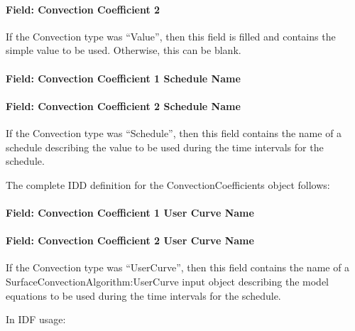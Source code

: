 \paragraph{Field: Convection Coefficient 2}\label{field-convection-coefficient-2}

If the Convection type was ``Value'', then this field is filled and contains the simple value to be used. Otherwise, this can be blank.

\paragraph{Field: Convection Coefficient 1 Schedule Name}\label{field-convection-coefficient-1-schedule-name}

\paragraph{Field: Convection Coefficient 2 Schedule Name}\label{field-convection-coefficient-2-schedule-name}

If the Convection type was ``Schedule'', then this field contains the name of a schedule describing the value to be used during the time intervals for the schedule.

The complete IDD definition for the ConvectionCoefficients object follows:

\paragraph{Field: Convection Coefficient 1 User Curve Name}\label{field-convection-coefficient-1-user-curve-name}

\paragraph{Field: Convection Coefficient 2 User Curve Name}\label{field-convection-coefficient-2-user-curve-name}

If the Convection type was ``UserCurve'', then this field contains the name of a SurfaceConvectionAlgorithm:UserCurve input object describing the model equations to be used during the time intervals for the schedule.

In IDF usage:

